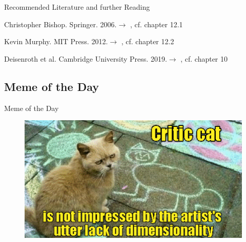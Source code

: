 \begin{frame}[allowframebreaks]{Recommended Literature and further Reading}{}
	\footnotesize
	\begin{thebibliography}{2}
			{Christopher Bishop. Springer. 2006.}{$\rightarrow$ \href{
				http://users.isr.ist.utl.pt/~wurmd/Livros/school/Bishop\%20-\%20Pattern\%20Recognition\%20And\%20Machine\%20Learning\%20-\%20Springer\%20\%202006.pdf
			}{}, cf. chapter 12.1}
			
			{Kevin Murphy. MIT Press. 2012.}{$\rightarrow$ \href{
				https://doc.lagout.org/science/Artificial\%20Intelligence/Machine\%20learning/Machine\%20Learning_\%20A\%20Probabilistic\%20Perspective\%20\%5BMurphy\%202012-08-24\%5D.pdf
			}{}, cf. chapter 12.2}

			{Deisenroth et al. Cambridge University Press. 2019.}{$\rightarrow$ \href{
				https://mml-book.github.io/
			}{}, cf. chapter 10}
	\end{thebibliography}
\end{frame}


\subsection{Meme of the Day}

\begin{frame}{Meme of the Day}{}
	\begin{figure}
		\includegraphics[scale=0.6]{13_pca/02_img/meme_of_the_day}
	\end{figure}
\end{frame}


\makethanks

